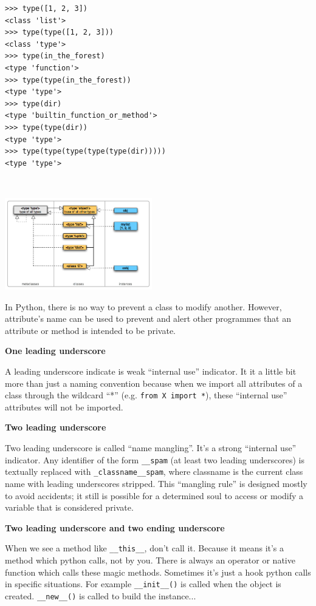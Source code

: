 \documentclass[a4paper,10pt]{article}
\begin{document}
\begin{minipage}[c]{.48\linewidth}
\begin{lstlisting}
>>> type([1, 2, 3])
<class 'list'>
>>> type(type([1, 2, 3]))
<class 'type'>
>>> type(in_the_forest)
<type 'function'>
>>> type(type(in_the_forest))
<type 'type'>
>>> type(dir)
<type 'builtin_function_or_method'>
>>> type(type(dir))
<type 'type'>
>>> type(type(type(type(type(dir)))))
<type 'type'>
\end{lstlisting}
~\\
\end{minipage} \hfill
\begin{minipage}[c]{.48\linewidth}
\includegraphics[height=4cm]{typesmap.png}
\end{minipage} 

In Python, there is no way to prevent a class to modify another. However, attribute's name can be used to prevent and alert other programmes that an attribute or method is intended to be private.

\textbf{One leading underscore}

A leading underscore indicate is weak ``internal use'' indicator. It it a little bit more than just a naming convention because when we import all attributes of a class through the wildcard ``*'' (e.g. \lstinline|from X import *|), these ``internal use'' attributes will not be imported.

\textbf{Two leading underscore}

Two leading underscore is called ``name mangling''. It’s a strong “internal use” indicator. Any identifier of the form \lstinline|__spam| (at least two leading underscores) is textually replaced with \lstinline|_classname__spam|, where classname is the current class name with leading underscores stripped. This “mangling rule” is designed mostly to avoid accidents; it still is possible for a determined soul to access or modify a variable that is considered private.

\textbf{Two leading underscore and two ending underscore}

When we see a method like \lstinline|__this__|, don't call it. Because it means it's a method which python calls, not by you. There is always an operator or native function which calls these magic methods. Sometimes it's just a hook python calls in specific situations. For example \lstinline|__init__()| is called when the object is created. \lstinline|__new__()| is called to build the instance...
\end{document}
